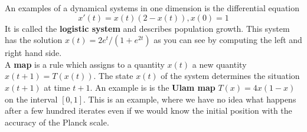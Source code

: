 \documentclass[12pt]{amsart}
\newcounter{example}    \def\example#1{ \item \fontsize{12}{15} \selectfont #1 \fontsize{12}{15} \selectfont }
\begin{document}
An examples of a dynamical systems in one dimension is the differential equation
$$  x'(t)  = x(t) (2-x(t)), x(0)=1 $$
It is called the {\bf logistic system} and describes population growth. 
This system has the solution $x(t) = 2 e^t/(1+e^{2t})$ as you can see by computing the left and right hand side.  \\

A {\bf map} is a rule which assigns to a quantity $x(t)$ a new quantity $x(t+1) = T(x(t))$. The state $x(t)$
of the system determines the situation $x(t+1)$ at time $t+1$. An example is 
is the {\bf Ulam map } $T(x) = 4 x(1-x)$ on the interval $[0,1]$. This is an example,
where we have no idea what happens after a few hundred iterates even if we would know the initial position with 
the accuracy of the Planck scale. \\
\end{document}

